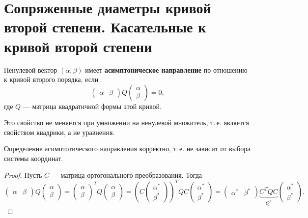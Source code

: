\section{Сопряженные диаметры кривой второй степени. Касательные к кривой второй степени}

\begin{definition}
    Ненулевой вектор $(\alpha, \beta)$ имеет \textbf{асимптоническое направление} по отношению к кривой второго порядка, если
    $$
    \begin{pmatrix}
        \alpha & \beta
    \end{pmatrix}
    Q
    \begin{pmatrix}
        \alpha\\\beta
    \end{pmatrix} = 0,
    $$
    где $Q$ --- матрица квадратичной формы этой кривой.
\end{definition}

\begin{remark}
    Это свойство не меняется при умножении на ненулевой множитель, т.\,е. является свойством квадрики, а не уравнения.
\end{remark}

\begin{statement}
    Определение асимптотического направления корректно, т.\,е. не зависит от выбора системы координат.
\end{statement}

\begin{proof}
    Пусть $C$ --- матрица ортогонального преобразования. Тогда
    $$
    \begin{pmatrix}
        \alpha & \beta
    \end{pmatrix}
    Q
    \begin{pmatrix}
        \alpha\\\beta
    \end{pmatrix} = 
    \begin{pmatrix}
        \alpha\\\beta
    \end{pmatrix}^TQ
    \begin{pmatrix}
        \alpha\\\beta
    \end{pmatrix} = 
    \left(
        C\begin{pmatrix}
            \alpha^\ast\\\beta^\ast
        \end{pmatrix}
    \right)^TQC
    \begin{pmatrix}
        \alpha^\ast\\\beta^\ast
    \end{pmatrix} = 
    \begin{pmatrix}
        \alpha^\ast & \beta^\ast
    \end{pmatrix}\underbrace{C^TQC}_{Q^\ast}
    \begin{pmatrix}
        \alpha^\ast\\\beta^\ast
    \end{pmatrix}.
    $$
\end{proof}

